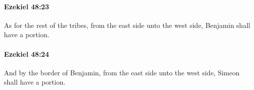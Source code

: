 		\paragraph{Ezekiel 48:23} %
			\label{EZEKIEL-48-23}

			As for the rest of the tribes, from the east side unto the west side, Benjamin shall have a portion.


		\paragraph{Ezekiel 48:24} %
			\label{EZEKIEL-48-24}

			And by the border of Benjamin, from the east side unto the west side, Simeon shall have a portion.


